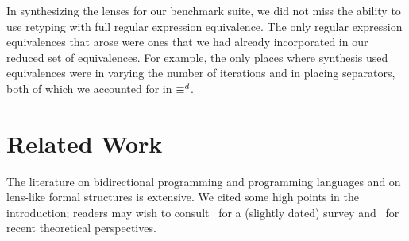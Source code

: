 \documentclass[numbers,10pt,preprint\ifanon ,nocopyrightspace\fi]{sigplanconf}
\begin{document}
In synthesizing the lenses for our benchmark suite, we did not miss
the ability to use retyping with full regular expression equivalence.
The only regular expression equivalences that arose were ones that we
had already incorporated in our reduced set of equivalences.
For example, the only places where synthesis
used \StarRegexType{} equivalences were in varying the number
of iterations and in placing separators, both of 
which we accounted for in $\equiv^d$.





\section{Related Work}

\ifanon\else {}
\fi

The literature on bidirectional programming and programming languages and on
lens-like formal structures is extensive.  We cited some high points in the
introduction; readers may wish to
consult~\cite{DBLP:conf/icmt/CzarneckiFHLST09} for a (slightly dated) survey
and~\cite{DBLP:journals/chinaf/FischerHP15,
  DBLP:conf/birthday/Abou-SalehCGMS16} for recent theoretical perspectives.
\end{document}
